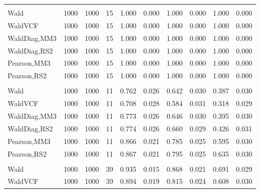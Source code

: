 \documentclass[
]{article}
\begin{document}
\begin{table}[H]
{\begin{tabular}[t]{lrrrrrrlrr}
\addlinespace[0.3em]
\multicolumn{10}{l}{\textbf{1F 15V}}\\
\hspace{1em}Wald & 1000 & 1000 & 15 & 1.000 & 0.000 & 1.000 & 0.000 & 1.000 & 0.000\\
\hspace{1em}WaldVCF & 1000 & 1000 & 15 & 1.000 & 0.000 & 1.000 & 0.000 & 1.000 & 0.000\\
\hspace{1em}WaldDiag,MM3 & 1000 & 1000 & 15 & 1.000 & 0.000 & 1.000 & 0.000 & 1.000 & 0.000\\
\hspace{1em}WaldDiag,RS2 & 1000 & 1000 & 15 & 1.000 & 0.000 & 1.000 & 0.000 & 1.000 & 0.000\\
\hspace{1em}Pearson,MM3 & 1000 & 1000 & 15 & 1.000 & 0.000 & 1.000 & 0.000 & 1.000 & 0.000\\
\hspace{1em}Pearson,RS2 & 1000 & 1000 & 15 & 1.000 & 0.000 & 1.000 & 0.000 & 1.000 & 0.000\\
\addlinespace[0.3em]
\multicolumn{10}{l}{\textbf{2F 10V}}\\
\hspace{1em}Wald & 1000 & 1000 & 11 & 0.762 & 0.026 & 0.642 & 0.030 & 0.387 & 0.030\\
\hspace{1em}WaldVCF & 1000 & 1000 & 11 & 0.708 & 0.028 & 0.584 & 0.031 & 0.318 & 0.029\\
\hspace{1em}WaldDiag,MM3 & 1000 & 1000 & 11 & 0.773 & 0.026 & 0.646 & 0.030 & 0.395 & 0.030\\
\hspace{1em}WaldDiag,RS2 & 1000 & 1000 & 11 & 0.774 & 0.026 & 0.660 & 0.029 & 0.426 & 0.031\\
\hspace{1em}Pearson,MM3 & 1000 & 1000 & 11 & 0.866 & 0.021 & 0.785 & 0.025 & 0.595 & 0.030\\
\hspace{1em}Pearson,RS2 & 1000 & 1000 & 11 & 0.867 & 0.021 & 0.795 & 0.025 & 0.635 & 0.030\\
\addlinespace[0.3em]
\multicolumn{10}{l}{\textbf{3F 15V}}\\
\hspace{1em}Wald & 1000 & 1000 & 39 & 0.935 & 0.015 & 0.868 & 0.021 & 0.691 & 0.029\\
\hspace{1em}WaldVCF & 1000 & 1000 & 39 & 0.894 & 0.019 & 0.815 & 0.024 & 0.608 & 0.030\\

\end{tabular}}
\end{table}
\end{document}
